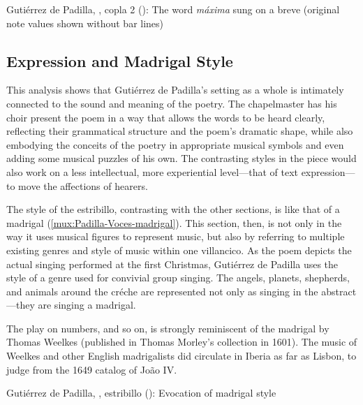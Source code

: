 {Gutiérrez de Padilla, , copla 2
(): The word \emph{máxima} sung on a breve (original note
values shown without bar lines)}

\subsection{Expression and Madrigal Style}

This analysis shows that Gutiérrez de Padilla's setting as a whole is intimately
connected to the sound and meaning of the poetry.
The chapelmaster has his choir present the poem in a way that allows the words
to be heard clearly, reflecting their grammatical structure and the poem's
dramatic shape, while also embodying the conceits of the poetry in appropriate
musical symbols and even adding some musical puzzles of his own.
The contrasting styles in the piece would also work on a less intellectual, more
experiential level---that of text expression---to move the affections of
hearers.

The style of the estribillo, contrasting with the other sections, is like that
of a madrigal (\cref{mux:Padilla-Voces-madrigal}).
This section, then, is  not only in the way it uses
musical figures to represent music, but also by referring to multiple existing
genres and style of music within one villancico.
As the poem depicts the actual singing performed at the first Christmas,
Gutiérrez de Padilla uses the style of a genre used for convivial group singing.
The angels, planets, shepherds, and animals around the créche are represented
not only as singing in the abstract---they are singing a madrigal.%
\begin{Footnote}
    The play on numbers,  and so on, is strongly
    reminiscent of the madrigal  by Thomas Weelkes (published in Thomas Morley's collection
     in 1601).
    The music of Weelkes and other English madrigalists did circulate in Iberia
    as far as Lisbon, to judge from the 1649 catalog of João IV.
\end{Footnote}

{Gutiérrez de Padilla, , estribillo
(): Evocation of madrigal style}

